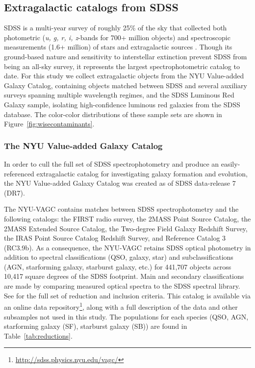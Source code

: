 \subsection{Extragalactic catalogs from SDSS}
SDSS is a multi-year survey of roughly 25\% of the sky that collected both photometric (\emph{u, g, r, i, z}-bands for 700+ million objects) and spectroscopic measurements (1.6+ million) of stars and extragalactic sources \citep{2000AJ....120.1579Y}. Though its ground-based nature and sensitivity to interstellar extinction prevent SDSS from being an all-sky survey, it represents the largest spectrophotometric catalog to date. For this study we collect extragalactic objects from the NYU Value-added Galaxy Catalog, containing objects matched between SDSS and several auxiliary surveys spanning multiple wavelength regimes, and the SDSS Luminous Red Galaxy sample, isolating high-confidence luminous red galaxies from the SDSS database. The color-color distributions of these sample sets are shown in Figure~\ref{fig:wisecontaminants}.

\subsubsection{The NYU Value-added Galaxy Catalog}
In order to cull the full set of SDSS spectrophotometry and produce an easily-referenced extragalactic catalog for investigating galaxy formation and evolution, the NYU Value-added Galaxy Catalog \citep[NYU-VAGC;][]{2005AJ....129.2562B} was created as of SDSS data-release 7 (DR7). 

The NYU-VAGC contains matches between SDSS spectrophotometry and the following catalogs: the FIRST radio survey, the 2MASS Point Source Catalog, the 2MASS Extended Source Catalog, the Two-degree Field Galaxy Redshift Survey, the IRAS Point Source Catalog Redshift Survey, and Reference Catalog 3 (RC3.9b). As a consequence, the NYU-VAGC retains SDSS optical photometry in addition to spectral classifications (QSO, galaxy, star) and subclassifications (AGN, starforming galaxy, starburst galaxy, etc.) for 441,707 objects across 10,417 square degrees of the SDSS footprint. Main and secondary classifications are made by comparing measured optical spectra to the SDSS spectral library. See \cite{2005AJ....129.2562B} for the full set of reduction and inclusion criteria. This catalog is available via an online data repository\footnote{\url{http://sdss.physics.nyu.edu/vagc/}}, along with a full description of the data and other subsamples not used in this study. The populations for each species (QSO, AGN, starforming galaxy (SF), starburst galaxy (SB)) are found in Table~\ref{tab:reductions}.


